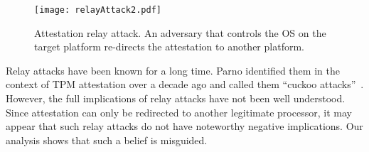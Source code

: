 \begin{figure}[t]
    \centering
    \texttt{[image: relayAttack2.pdf]}
    \caption{Attestation relay attack. An adversary that controls the OS on the target platform re-directs the attestation to another platform.}
    \label{fig:SystemModel}
\end{figure}

Relay attacks have been known for a long time. Parno identified them in the context of TPM attestation over a decade ago and called them ``cuckoo attacks''~\cite{parno2008bootstrapping}. However, the full implications of relay attacks have not been well understood. Since attestation can only be redirected to another legitimate processor, it may appear that such relay attacks do not have noteworthy negative implications. Our analysis shows that such a belief is misguided.

